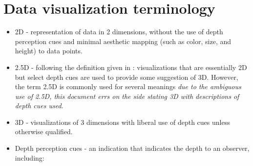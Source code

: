 \documentclass{monashthesis}
\begin{document}
\section{Data visualization terminology}\label{sec:3d-terminology}

\begin{itemize}
\tightlist
\item
  2D - representation of data in 2 dimensions, without the use of depth
  perception cues and minimal aesthetic mapping (such as color, size,
  and height) to data points.
\item
  2.5D - following the definition given in
  \textcite{ware_designing_2000}: visualizations that are essentially 2D
  but select depth cues are used to provide some suggestion of 3D.
  However, the term 2.5D is commonly used for several meanings \emph{due
  to the ambiguous use of 2.5D, this document errs on the side stating
  3D with descriptions of depth cues used}.
\item
  3D - visualizations of 3 dimensions with liberal use of depth cues
  unless otherwise qualified.
\item
  Depth perception cues - an indication that indicates the depth to an
  observer, including:


\end{itemize}
\end{document}
